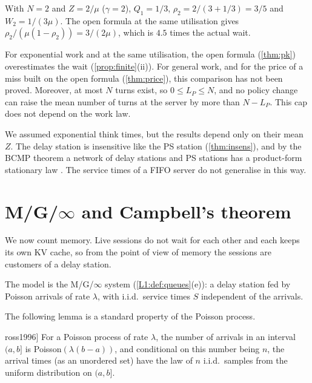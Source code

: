 \begin{example}\label{L4:ex:two}
With $N=2$ and $Z=2/\mu$ ($\gamma=2$), $Q_1=1/3$, $\rho_2=2/(3+1/3)=3/5$ and
$W_2=1/(3\mu)$. The open formula at the same utilisation gives
$\rho_2/(\mu(1-\rho_2))=3/(2\mu)$, which is $4.5$ times the actual wait.
\end{example}

\begin{remark}
For exponential work and at the same utilisation, the open formula (\cref{thm:pk})
overestimates the wait (\cref{prop:finite}(ii)). For general work, and for the price
of a miss built on the open formula (\cref{thm:price}), this comparison has not been
proved. Moreover, at most $N$ turns exist, so $0\le L_P\le N$, and no
policy change can raise the mean number of turns at the server by more than
$N-L_P$. This cap does not depend on the work law.
\end{remark}

\begin{remark}
We assumed exponential think times, but the results depend only on their mean
$Z$. The delay station is insensitive like the PS station (\cref{thm:insens}), and
by the BCMP theorem a network of delay stations and PS stations has a
product-form stationary law \cite{bcmp1975}. The service times of a FIFO server
do not generalise in this way.
\end{remark}

\section{M/G/\texorpdfstring{$\infty$}{infinity} and Campbell's theorem}\label{L4:sec:campbell}

We now count memory. Live sessions do not wait for each other and each keeps its
own KV cache, so from the point of view of memory the sessions are customers of a
delay station.

The model is the M/G/$\infty$ system (\cref{L1:def:queues}(e)): a delay station fed
by Poisson arrivals of rate $\lambda$, with i.i.d.\ service times $S$ independent of
the arrivals.

The following lemma is a standard property of the Poisson process.

\begin{lemma}[Conditional uniformity \cite[\S2.3]{ross1996}]\label{L4:lem:uniform}
For a Poisson process of rate $\lambda$, the number of arrivals in an interval
$(a,b]$ is Poisson$(\lambda(b-a))$, and conditional on this number being $n$, the
arrival times (as an unordered set) have the law of $n$ i.i.d.\ samples from the
uniform distribution on $(a,b]$.
\end{lemma}

